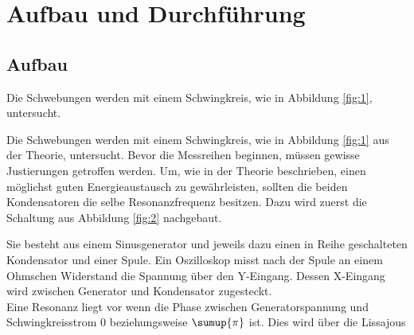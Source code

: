 \section{Aufbau und Durchführung}
\label{sec:Durchführung}
\subsection{Aufbau}
Die Schwebungen werden mit einem Schwingkreis, wie in Abbildung \ref{fig:1}, untersucht.








Die Schwebungen werden mit einem Schwingkreis, wie in Abbildung \ref{fig:1} aus der Theorie, untersucht.
Bevor die Messreihen beginnen, müssen gewisse Justierungen getroffen werden.
Um, wie in der Theorie beschrieben, einen möglichst guten Energieaustausch zu gewährleisten, sollten die beiden Kondensatoren die selbe Resonanzfrequenz besitzen.
Dazu wird zuerst die Schaltung aus Abbildung \ref{fig:2} nachgebaut.



Sie besteht aus einem Sinusgenerator und jeweils dazu einen in Reihe geschalteten Kondensator und einer Spule.
Ein Oszilloskop misst nach der Spule an einem Ohmschen Widerstand die Spannung über den Y-Eingang.
Dessen X-Eingang wird zwischen Generator und Kondensator zugesteckt.\\
Eine Resonanz liegt vor wenn die Phase zwischen Generatorspannung und Schwingkreisstrom 0 beziehungsweise $\sumup{\pi}$ ist.
Dies wird über die Lissajous
